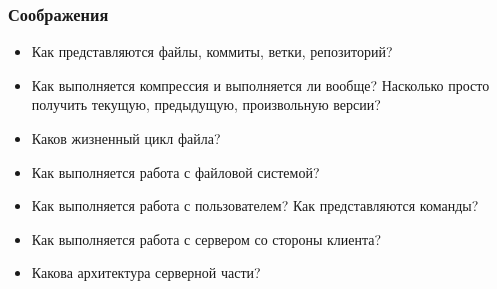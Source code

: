 \documentclass[xetex,mathserif,serif]{beamer}
\begin{document}
    \begin{frame}
        \frametitle{Соображения}
        \begin{itemize}
            \item Как представляются файлы, коммиты, ветки, репозиторий?
            \item Как выполняется компрессия и выполняется ли вообще? Насколько просто получить текущую, предыдущую, произвольную версии?
            \item Каков жизненный цикл файла?
            \item Как выполняется работа с файловой системой?
            \item Как выполняется работа с пользователем? Как представляются команды?
            \item Как выполняется работа с сервером со стороны клиента?
            \item Какова архитектура серверной части?
        \end{itemize}
    \end{frame}
\end{document}
